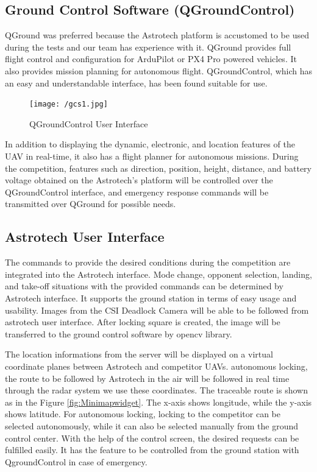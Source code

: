 \documentclass[12pt]{article}
\begin{document}
\subsection{Ground Control Software (QGroundControl)}
QGround was preferred because the Astrotech platform is accustomed to be used during the tests and our team has experience with it. QGround provides full flight control and configuration for ArduPilot or PX4 Pro powered vehicles. It also provides mission planning for autonomous flight. QGroundControl, which has an easy and understandable interface, has been found suitable for use.     \\ 
\begin{figure}[ht]
 	\centering
 	\texttt{[image: /gcs1.jpg]}
 	\caption{QGroundControl User Interface}
        \label{fig:Q_ground}
 \end{figure}
\FloatBarrier
\justify 
In addition to displaying the dynamic, electronic, and location features of the UAV in real-time, it also has a flight planner for autonomous missions. During the competition, features such as direction, position, height, distance, and battery voltage obtained on the Astrotech’s platform will be controlled over the QGroundControl interface, and emergency response commands will be transmitted over QGround for possible needs.

\subsection*{Astrotech User Interface}
The commands to provide the desired conditions during the competition are integrated into the Astrotech interface. Mode change, opponent selection, landing, and take-off situations with the provided commands can be determined by Astrotech interface. It supports the ground station in terms of easy usage and usability.     
\justify
     Images from the CSI Deadlock Camera will be able to be followed from astrotech user interface. After locking square is created, the image will be transferred to the ground control software by opencv library.
\justify

       The location informations from the server will be displayed on a virtual coordinate planes between Astrotech and competitor UAVs. autonomous locking, the route to be followed by Astrotech in the air will be followed in real time through the radar system we use these coordinates. The traceable route is shown as in the Figure \ref{fig:Minimapwidget}. The x-axis shows longitude, while the y-axis shows latitude.
      For autonomous locking, locking to the competitor can be selected autonomously, while it can also be selected manually from the ground control center.
      With the help of the control screen, the desired requests can be fulfilled easily. It has the feature to be controlled from the ground station with QgroundControl in case of emergency.
      \clearpage
\end{document}
